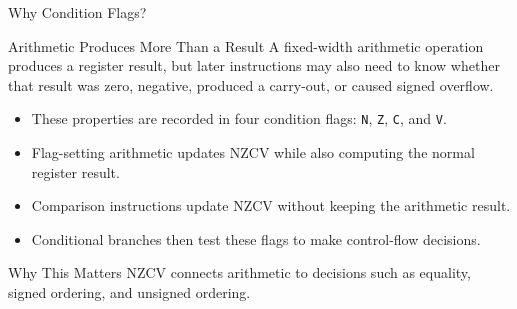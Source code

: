\documentclass[aspectratio=169,11pt,t]{beamer}
\newcommand{\code}[1]{\texttt{#1}}
\begin{document}
\begin{frame}{Why Condition Flags?}
\begin{block}{Arithmetic Produces More Than a Result}
A fixed-width arithmetic operation produces a register result, but later instructions may also need to know whether that result was zero, negative, produced a carry-out, or caused signed overflow.
\end{block}
\vspace{0.2cm}
\begin{itemize}
\item These properties are recorded in four condition flags: \code{N}, \code{Z}, \code{C}, and \code{V}.
\item Flag-setting arithmetic updates NZCV while also computing the normal register result.
\item Comparison instructions update NZCV without keeping the arithmetic result.
\item Conditional branches then test these flags to make control-flow decisions.
\end{itemize}
\vspace{0.15cm}
\begin{block}{Why This Matters}
NZCV connects arithmetic to decisions such as equality, signed ordering, and unsigned ordering.
\end{block}
\end{frame}










\end{document}
